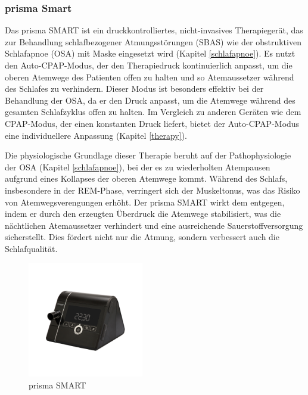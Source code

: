 \documentclass[a4paper, 12pt]{article}
\begin{document}
\subsubsection{prisma Smart} %
Das prisma SMART ist ein druckkontrolliertes, nicht-invasives Therapiegerät, das zur Behandlung schlafbezogener Atmungsstörungen (SBAS) wie der obstruktiven Schlafapnoe (OSA) mit Maske eingesetzt wird (Kapitel \ref{schlafapnoe}). Es nutzt den Auto-CPAP-Modus, der den Therapiedruck kontinuierlich anpasst, um die oberen Atemwege des Patienten offen zu halten und so Atemaussetzer während des Schlafes zu verhindern. Dieser Modus ist besonders effektiv bei der Behandlung der OSA, da er den Druck anpasst, um die Atemwege während des gesamten Schlafzyklus offen zu halten. Im Vergleich zu anderen Geräten wie dem CPAP-Modus, der einen konstanten Druck liefert, bietet der Auto-CPAP-Modus eine individuellere Anpassung (Kapitel \ref{therapy}). 

Die physiologische Grundlage dieser Therapie beruht auf der Pathophysiologie der OSA (Kapitel \ref{schlafapnoe}), bei der es zu wiederholten Atempausen aufgrund eines Kollapses der oberen Atemwege kommt. Während des Schlafs, insbesondere in der REM-Phase, verringert sich der Muskeltonus, was das Risiko von Atemwegsverengungen erhöht. Der prisma SMART wirkt dem entgegen, indem er durch den erzeugten Überdruck die Atemwege stabilisiert, was die nächtlichen Atemaussetzer verhindert und eine ausreichende Sauerstoffversorgung sicherstellt. Dies fördert nicht nur die Atmung, sondern verbessert auch die Schlafqualität.
\cite{manual_smart}

\begin{figure}[H]
	\centering
	\includegraphics[width=0.45\textwidth]{prisma_SMART.jpg}
	\caption{prisma SMART \cite{pic_prisma_smart}}
	\label{pic_prismaSMART}
\end{figure}

\newpage
\end{document}
